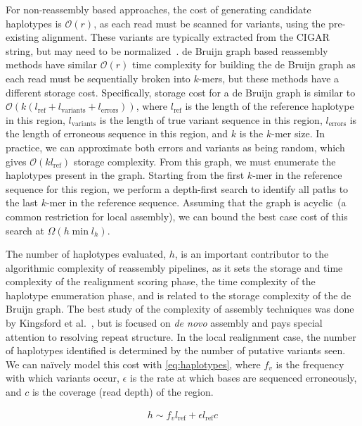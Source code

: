 \documentclass{bioinfo}
\begin{document}
For non-reassembly based approaches, the cost of generating candidate haplotypes is $\mathcal{O}(r)$,
as each read must be scanned for variants, using the pre-existing alignment. These variants are typically
extracted from the CIGAR string, but may need to be normalized~\citep{li14}. de Bruijn graph based 
reassembly methods have similar $\mathcal{O}(r)$ time complexity for building the de Bruijn
graph as each read must be sequentially broken into $k$-mers, but these methods have a different
storage cost. Specifically, storage cost for a de Bruijn graph is similar to $\mathcal{O}(k
(l_{\text{ref}} + l_{\text{variants}} + l_{\text{errors}}))$, where $l_{\text{ref}}$ is the length of the reference
haplotype in this region, $l_{\text{variants}}$ is the length of true variant sequence in this region, 
$l_{\text{errors}}$ is the length of erroneous sequence in this region, and $k$ is the $k$-mer size. In
practice, we can approximate both errors and variants as being random, which gives $\mathcal{O}(k
l_{\text{ref}})$ storage complexity. From this graph, we must enumerate the haplotypes present in the
graph. Starting from the first $k$-mer in the reference sequence for this region, we perform a depth-first
search to identify all paths to the last $k$-mer in the reference sequence. Assuming that the graph is
acyclic~(a common restriction for local assembly), we can
bound the best case cost of this search at $\Omega(h \min l_h)$.

The number of haplotypes evaluated, $h$, is an important contributor to the algorithmic complexity of
reassembly pipelines, as it sets the storage and time complexity of the realignment scoring phase, the
time complexity of the haplotype enumeration phase, and is related to the storage complexity of the
de Bruijn graph. The best study of the complexity of assembly techniques was done by Kingsford
et al.~\citep{kingsford10}, but is focused on \emph{de novo} assembly and pays special attention to
resolving repeat structure. In the local realignment case, the number of haplotypes identified is determined
by the number of putative variants seen. We can na\"{i}vely model this cost with \eqref{eq:haplotypes},
where $f_v$ is the frequency with which variants occur, $\epsilon$ is the rate at which bases are
sequenced erroneously, and $c$ is the coverage (read depth) of the region.

\begin{align}
\label{eq:haplotypes}
h \sim f_v l_{\text{ref}} + \epsilon l_{\text{ref}} c
\end{align}
\end{document}
